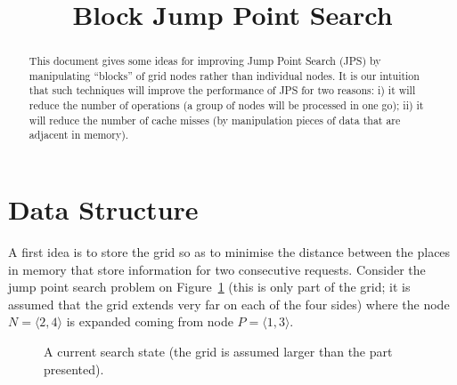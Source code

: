 \documentclass{article}
\begin{document}
\title{Block Jump Point Search}
\maketitle

\begin{abstract}
  This document gives some ideas for improving Jump Point Search (JPS) 
  by manipulating ``blocks'' of grid nodes rather than individual nodes.  
  It is our intuition that such techniques 
  will improve the performance of JPS for two reasons: 
  i) it will reduce the number of operations 
  (a group of nodes will be processed in one go); 
  ii) it will reduce the number of cache misses 
  (by manipulation pieces of data that are adjacent in memory).  
\end{abstract}

\section{Data Structure}

A first idea is to store the grid 
so as to minimise the distance between the places in memory 
that store information for two consecutive requests.  
Consider the jump point search problem 
on Figure~\ref{fig::grid} (this is only part of the grid; 
it is assumed that the grid extends very far on each of the four sides) 
where the node $N = \langle 2,4\rangle$ is expanded 
coming from node $P = \langle 1,3\rangle$.  

\begin{figure}[ht]
  \begin{center}
  \end{center}
  \caption{A current search state 
    (the grid is assumed larger than the part presented).}
  \label{fig::grid}
\end{figure}
\end{document}
